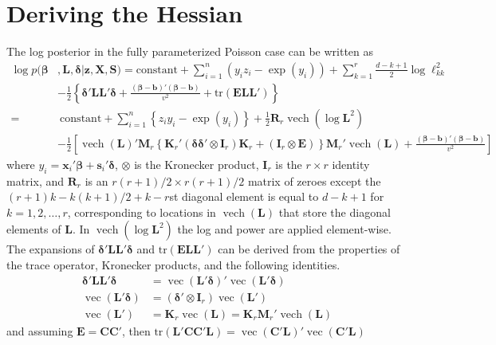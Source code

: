 \documentclass[12pt]{article}
\newcommand{\Appendix}
{%
\def\thesection{Appendix~\Alph{section}:}
\def\thesubsection{A.\arabic{subsection}}
}
\DeclareMathOperator{\vect}{vec}
\DeclareMathOperator{\vech}{vech}
\begin{document}
\section{Deriving the Hessian}\label{sec:hess}
\begin{appendix}
\Appendix    %
\renewcommand{\theequation}{B.\arabic{equation}}
\setcounter{equation}{0}

The log posterior in the fully parameterized Poisson case can be written as
\begin{align*}
\log p(\bm{\beta}&, \bm{L}, \bm{\delta}|\bm{z}, \bm{X}, \bm{S}) = \mathrm{constant}+ \sum_{i=1}^n\left(y_iz_i - \exp(y_i)\right) + \sum_{k=1}^r \frac{d - k + 1}{2}\log\ell_{kk}^2\\
& - \frac{1}{2}\left\{\bm{\delta}'\bm{L}\bm{L}'\bm{\delta}+\frac{(\bm{\beta} - \bm{b})'(\bm{\beta} - \bm{b})}{v^2} + \mathrm{tr}(\bm{E}\bm{L}\bm{L}')\right\}\\ 
=&\ \mathrm{constant} + \sum_{i=1}^n \left\{z_iy_i - \exp(y_i)\right\} + \frac{1}{2}\bm{R}_r\vech(\log\bm{L}^2)\\
&  -\frac{1}{2}\left[\vech(\bm{L})'\bm{M}_r\left\{\bm{K}_r'(\bm{\delta}\bm{\delta}'\otimes \bm{I}_r)\bm{K}_r + (\bm{I}_r\otimes \bm{E})\right\}\bm{M}_r'\vech(\bm{L})+\frac{(\bm{\beta}-\bm{b})'(\bm{\beta}-\bm{b})}{v^2}\right]
\end{align*}
where $y_i = \bm{x}_i'\bm{\beta} + \bm{s}_i'\bm{\delta}$, $\otimes$ is the Kronecker product, $\bm{I}_r$ is the $r\times r$ identity matrix, and $\bm{R}_r$ is an $r(r+1)/2\times r(r+1)/2$ matrix of zeroes except the $(r + 1)k - k(k+1)/2 + k - r$st diagonal element is equal to $d - k + 1$ for $k=1, 2, \dots, r$, corresponding to locations in $\vech(\bm{L})$ that store the diagonal elements of $\bm{L}$. In $\vech(\log\bm{L}^2)$ the log and power are applied element-wise. The expansions of $\bm{\delta}'\bm{L}\bm{L}'\bm{\delta}$ and $\mathrm{tr}(\bm{E}\bm{L}\bm{L}')$ can be derived from the properties of the trace operator, Kronecker products, and the following identities.
\begin{align*}
\bm{\delta}'\bm{L}\bm{L}'\bm{\delta}& = \vect(\bm{L}'\bm{\delta})'\vect(\bm{L}'\bm{\delta})\\ 
\vect(\bm{L}'\bm{\delta})& = (\bm{\delta}'\otimes \bm{I}_r)\vect(\bm{L}')\\
\vect(\bm{L}')& = \bm{K}_r\vect(\bm{L}) = \bm{K}_r\bm{M}_r'\vech(\bm{L})
\end{align*}
and assuming $\bm{E} = \bm{C}\bm{C}'$, then $\mathrm{tr}(\bm{L'}\bm{C}\bm{C}'\bm{L}) = \vect(\bm{C}'\bm{L})'\vect(\bm{C}'\bm{L})$

\end{appendix}
\end{document}
